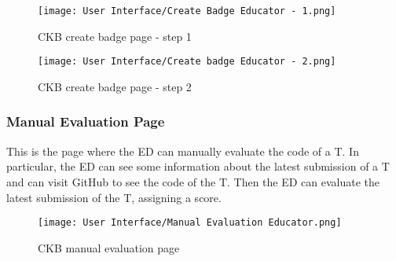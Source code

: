 \begin{figure}[H]
  \centering
  \texttt{[image: User Interface/Create Badge Educator - 1.png]}
  \caption{CKB create badge page - step 1}
  \label{fig:create_badge1}
\end{figure}

\begin{figure}[H]
  \centering
  \texttt{[image: User Interface/Create badge Educator - 2.png]}
  \caption{CKB create badge page - step 2}
  \label{fig:create_badge2}
\end{figure}

\newpage

\subsubsection*{Manual Evaluation Page}
\label{ss:manual_evaluation_page}%
This is the page where the ED can manually evaluate the code of a T. In particular, the ED can see some information about the latest submission of a T and can visit GitHub to see the code of the T. Then the ED can evaluate the latest submission of the T, assigning a score.

\begin{figure}[H]
  \centering
  \texttt{[image: User Interface/Manual Evaluation Educator.png]}
  \caption{CKB manual evaluation page}
  \label{fig:manual_evaluation}
\end{figure}
